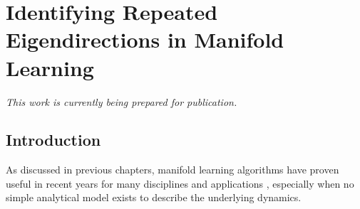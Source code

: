 
\chapter{Identifying Repeated Eigendirections in Manifold Learning \label{ch:harmonics}}

\graphicspath{{ch-harmonics/figures/}}

{\em This work is currently being prepared for publication.}


\section{Introduction}

As discussed in previous chapters, manifold learning algorithms have proven useful in recent years for many disciplines and applications \cite{gepshtein2013image, fernandez2014diffusion, singer2011viewing, yuan2014automated, zhao2003face, trapnell2014dynamics, kemelmacher2011exploring, sifre2013rotation}, especially when no simple analytical model exists to describe the underlying dynamics.
%
%
